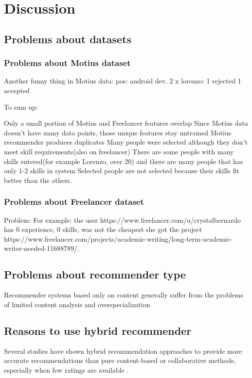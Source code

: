 
\chapter{Discussion}\label{chapter:discussion}

\section{Problems about datasets}

\subsection{Problems about Motius dataset}

Another funny thing in Motius data: pos: android dev. 2 x lorenzo: 1 rejected 1 accepted

To sum up:

Only a small portion of Motius and Freelancer features overlap
Since Motius data doesn't have many data points, those unique features stay untrained
Motius recommender produces duplicates
Many people were selected although they don't meet skill requirements(also on freelancer)
There are some people with many skills entered(for example Lorenzo, over 20) and there are many people that has only 1-2 skills in system
Selected people are not selected because their skills fit better than the others.

\subsection{Problems about Freelancer dataset}

Problem: For example: the user https://www.freelancer.com/u/crystalbernardo has 0 experience, 0 skills, was not the cheapest she got the project https://www.freelancer.com/projects/academic-writing/long-term-academic-writer-needed-11688789/.

\section{Problems about recommender type}
Recommender systems based only on content generally suffer from the problems of limited content analysis and overspecialization \cite{shardanand1995social}

\section{Reasons to use hybrid recommender}
Several studies have shown hybrid recommendation approaches to provide more accurate recommendations than pure content-based or collaborative methods, especially when few ratings are available \cite{adomavicius2005toward}.

